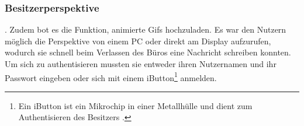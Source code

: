 \subsubsection{Besitzerperspektive}
. Zudem bot es die Funktion, animierte Gifs hochzuladen.
Es war den Nutzern möglich die Perspektive von einem PC oder direkt am Display aufzurufen, wodurch sie schnell beim Verlassen des Büros eine Nachricht schreiben konnten. Um sich zu authentisieren mussten sie entweder ihren Nutzernamen und ihr Passwort eingeben oder sich mit einem iButton\footnote{Ein iButton ist ein Mikrochip in einer Metallhülle und dient \bspw zum Authentisieren des Besitzers \cite{iButton:website}.} anmelden.
